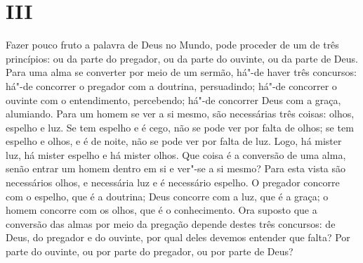 \section*{III}

Fazer pouco fruto a palavra de Deus no Mundo, pode proceder de um de
três princípios: ou da parte do pregador, ou da parte do ouvinte, ou da
parte de Deus. Para uma alma se converter por meio de um sermão, há"-de
haver três concursos: há"-de concorrer o pregador com a doutrina,
persuadindo; há"-de concorrer o ouvinte com o entendimento, percebendo;
há"-de concorrer Deus com a graça, alumiando. Para um homem se ver a si
mesmo, são necessárias três coisas: olhos, espelho e luz. Se tem
espelho e é cego, não se pode ver por falta de olhos; se tem espelho e
olhos, e é de noite, não se pode ver por falta de luz. Logo, há mister
luz, há mister espelho e há mister olhos. Que coisa é a conversão de uma
alma, senão entrar um homem dentro em si e ver"-se a si mesmo? Para esta
vista são necessários olhos, e necessária luz e é necessário espelho.
O pregador concorre com o espelho, que é a doutrina; Deus concorre com a
luz, que é a graça; o homem concorre com
os olhos, que é o conhecimento. Ora suposto que a conversão das almas
por meio da pregação depende destes três concursos: de Deus, do pregador
e do ouvinte, por qual deles devemos entender que falta? Por parte do
ouvinte, ou por parte do pregador, ou por parte de Deus?

